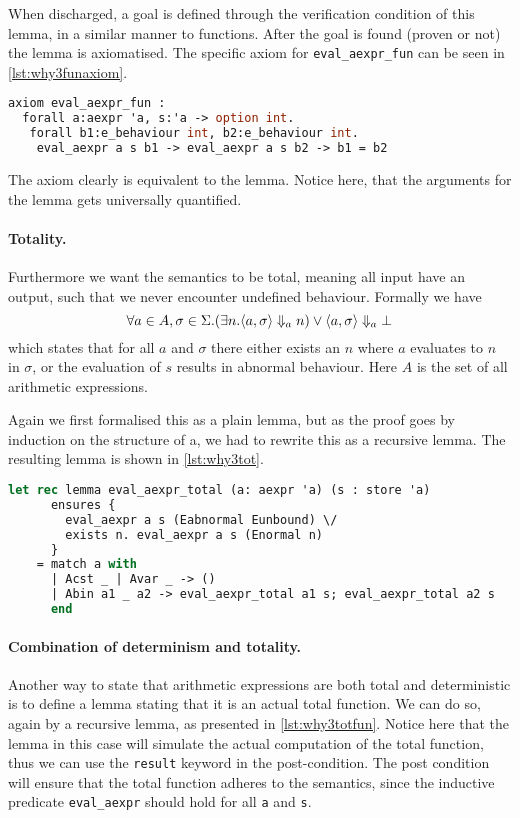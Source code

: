 When discharged, a goal is defined through the verification condition of this lemma, in a similar manner to functions.
After the goal is found (proven or not) the lemma is axiomatised. The specific axiom for \texttt{eval_aexpr_fun} can be seen in \autoref{lst:why3funaxiom}.

\begin{lstlisting}[caption={Axiom of functional lemma},label={lst:why3funaxiom},language=sml]
axiom eval_aexpr_fun :
  forall a:aexpr 'a, s:'a -> option int.
   forall b1:e_behaviour int, b2:e_behaviour int.
    eval_aexpr a s b1 -> eval_aexpr a s b2 -> b1 = b2
\end{lstlisting}

The axiom clearly is equivalent to the lemma. Notice here, that the arguments for the lemma gets universally quantified.

\paragraph{Totality.}
Furthermore we want the semantics to be total, meaning all input have an output, such that we never encounter undefined behaviour.
Formally we have
\[
\forall a \in A, \sigma \in \Sigma. (\exists n. \langle a, \sigma \rangle \Downarrow_{a} n) \vee \langle a, \sigma \rangle \Downarrow_{a} \bot
\]
which states that for all $a$ and $\sigma$ there either exists an $n$ where $a$ evaluates to $n$ in $\sigma$, or the evaluation of $s$ results in abnormal behaviour. Here $A$ is the set of all arithmetic expressions.

Again we first formalised this as a plain lemma, but as the proof goes by induction on the structure of a,
we had to rewrite this as a recursive lemma. The resulting lemma is shown in \autoref{lst:why3tot}.

\begin{lstlisting}[caption={Axiom of functional lemma},label={lst:why3tot},language=sml]
  let rec lemma eval_aexpr_total (a: aexpr 'a) (s : store 'a)
      ensures {
        eval_aexpr a s (Eabnormal Eunbound) \/
        exists n. eval_aexpr a s (Enormal n)
      }
    = match a with
      | Acst _ | Avar _ -> ()
      | Abin a1 _ a2 -> eval_aexpr_total a1 s; eval_aexpr_total a2 s
      end
\end{lstlisting}

\paragraph{Combination of determinism and totality.}
Another way to state that arithmetic expressions are both total and deterministic is to define a lemma stating that it is an actual total function.
We can do so, again by a recursive lemma, as presented in \autoref{lst:why3totfun}. Notice here that the lemma in this case will simulate the actual
computation of the total function, thus we can use the \texttt{result} keyword in the post-condition.
The post condition will ensure that the total function adheres to the semantics, since the inductive predicate
\texttt{eval_aexpr} should hold for all \texttt{a} and \texttt{s}.

